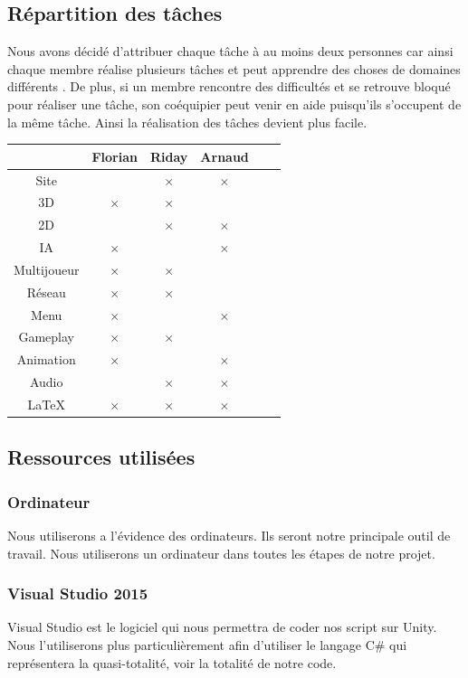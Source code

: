 \documentclass[a4paper, 12pt]{article}
\begin{document}
\subsection{Répartition des tâches}
Nous avons décidé d’attribuer chaque tâche à au moins deux personnes car ainsi chaque membre réalise plusieurs tâches et peut apprendre des choses de domaines différents . De plus, si un membre rencontre des difficultés et se retrouve bloqué pour réaliser une tâche, son coéquipier peut venir en aide puisqu’ils s’occupent de la même tâche. Ainsi la réalisation des tâches devient plus facile.
\bigbreak
\bigbreak
\begin{center}
	\begin{tabular}{|c||c|c|c|c|c|}
		\hline
		& Florian & Riday & Arnaud \\
		\hline
		Site &  & $\times$ & $\times$\\
		\hline
		3D &  $\times$ & $\times$ &\\
		\hline
		2D & & $\times$ & $\times$\\
		\hline
		IA & $\times$ &  & $\times$\\
		\hline
		Multijoueur & $\times$  & $\times$ &\\
		\hline
		Réseau & $\times$ & $\times$ &  \\
		\hline
		Menu & $\times$ & & $\times$\\
		\hline
		Gameplay & $\times$ & $\times$ &\\
		\hline
		Animation & $\times$ & & $\times$\\		
		\hline
		Audio & & $\times$ & $\times$\\
		\hline
		\LaTeX & $\times$ & $\times$ & $\times$ \\
		\hline
	\end{tabular}
\end{center}
	\newpage
\subsection{Ressources utilisées}
	\subsubsection{Ordinateur}
	Nous utiliserons a l'évidence des ordinateurs. Ils seront notre principale outil de travail. Nous utiliserons un ordinateur dans toutes les étapes de notre projet. 
	\subsubsection{Visual Studio 2015}
	Visual Studio est le logiciel qui nous permettra de coder nos script sur Unity. Nous l'utiliserons plus particulièrement afin d'utiliser le langage C\# qui représentera la quasi-totalité, voir la totalité de notre code.
\end{document}
